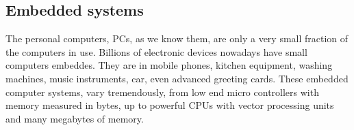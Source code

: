 \documentclass[11pt]{report}
\begin{document}
\begin{comment}
Development for mobile devices is very diverse.
Surveys about mobile devices often focus on smartphones (high end mobile devices) and thus market shares in surveys, such as \cite{smartphonesurvey} does not include the more low end devices.
On the contrary, this project focuses on development also targeting low end devices.

Looking at lowest end mobiled devices: if user applications are loadable at all, it is in the shape of Java Midlets.
...

Higher end devices often supports native code.
This has different APIs and there are lots of different platforms.
Some of the main platforms for smartphones, and similar are:
Symbian, Qt-embedded (a linux), RIM-BlackBerry, iPhone, Android (a linux with a Java-like vm on top), Windows CE, etc.
... description of different operating systems...

Many of these platforms requires some fees/licenses and code signing for developing and/or distributing applications. 
This makes them less attractive for further studies as well as further development.

Additionally, the BREW mobile platform seems to play an important role in North America, but it is closed and needs code signing, and at the same time it is not common in Europe, so I will not look further into that platform.

Besides Java and native code, JavaScript is becoming a potential language for applications for high end phone. 
This is both due to its integration with the web, which means that it will be available on the phones with advanced browsers, due to the increased amount of memory on high end phones
and due to recent major performance advances within the JavaScript implementations, which are propagating towards mobile devices.

\end{comment}

\subsection{Embedded systems}
The personal computers, PCs, as we know them, are only a very small fraction of the computers in use.
Billions of electronic devices nowadays have small computers embeddes. They are in mobile phones, kitchen equipment, washing machines, music instruments, car, even advanced greeting cards. 
These embedded computer systems, vary tremendously, from low end micro controllers with memory measured in bytes, up to powerful CPUs with vector processing units and many megabytes of memory.
\end{document}
